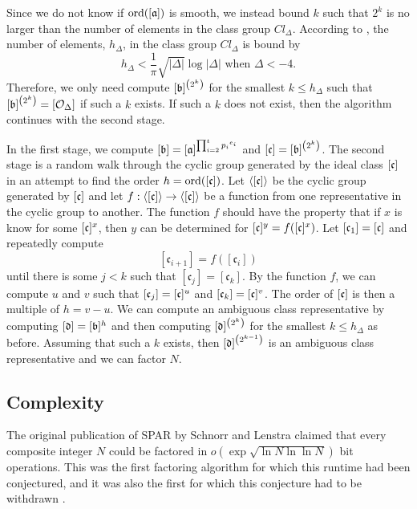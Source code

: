 \documentclass{ucalgthes1}
\theoremstyle{plain}
\theoremstyle{definition}
\DeclareMathOperator{\ord}{ord}
\begin{document}
Since we do not know if $\ord(\aclass)$ is smooth, we instead bound $k$ such that $2^k$ is no larger than the number of elements in the class group $Cl_\Delta$.  According to \cite[p.155]{Jacobson2009}, the number of elements, $h_\Delta$, in the class group $Cl_\Delta$ is bound by
\[
	h_\Delta < \frac{1}{\pi} \sqrt{|\Delta|}\log{|\Delta|} \textrm{ when } \Delta < -4.
\]
Therefore, we only need compute $[\mathfrak b]^{\left(2^k\right)}$ for the smallest $k \le h_\Delta$ such that $[\mathfrak b]^{\left(2^k\right)} = [\mathcal O_\Delta]$ if such a $k$ exists. If such a $k$ does not exist, then the algorithm continues with the second stage.

In the first stage, we compute $[\mathfrak b] = [\mathfrak a]^{\prod_{i=2}^t {p_i}^{e_i}}$ and $[\mathfrak c] = [\mathfrak b]^{\left(2^k\right)}$.  The second stage is a random walk through the cyclic group generated by the ideal class $[\mathfrak c]$ in an attempt to find the order $h = \ord(\cclass)$.  Let $\langle [\mathfrak c] \rangle$ be the cyclic group generated by $[\mathfrak c]$ and let $f : \langle [\mathfrak c] \rangle \rightarrow \langle [\mathfrak c] \rangle$ be a function from one representative in the cyclic group to another.  The function $f$ should have the property that if $x$ is know for some $[\mathfrak c] ^x$, then $y$ can be determined for $[\mathfrak c]^y = f([\mathfrak c]^x)$.  Let $[\mathfrak c_1] = [\mathfrak c]$ and repeatedly compute
\[
	[\mathfrak c_{i+1}] = f([\mathfrak c_i])
\]
until there is some $j < k$ such that $[\mathfrak c_j] = [\mathfrak c_k]$.  By the function $f$, we can compute $u$ and $v$ such that $[\mathfrak c_j]=[\mathfrak c]^u$ and $[\mathfrak c_k]=[\mathfrak c]^v$.  The order of $[\mathfrak c]$ is then a multiple of $h = v - u$.  We can compute an ambiguous class representative by computing $[\mathfrak d] = [\mathfrak b]^h$ and then computing $[\mathfrak d]^{\left(2^k\right)}$ for the smallest $k \le h_\Delta$ as before.  Assuming that such a $k$ exists, then $[\mathfrak d]^{\left(2^{k-1}\right)}$ is an ambiguous class representative and we can factor $N$.

\subsection{Complexity}

The original publication of SPAR by Schnorr and Lenstra \cite{Schnorr1984} claimed that every composite integer $N$ could be factored in $o\left(\exp\sqrt{\ln N \ln\ln N}\right)$ bit operations.  This was the first factoring algorithm for which this runtime had been conjectured, and it was also the first for which this conjecture had to be withdrawn \cite{Lenstra1992}.
\end{document}
